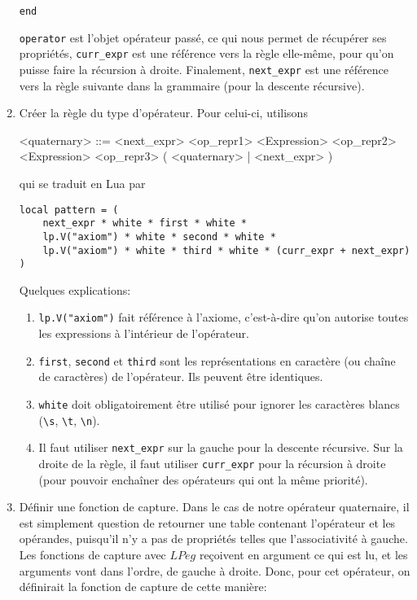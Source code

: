 \documentclass{article}
\begin{document}
\begin{enumerate}
\begin{verbatim}
end
	\end{verbatim}
	\lstinline|operator| est l'objet opérateur passé, ce qui nous permet de récupérer ses propriétés, \lstinline|curr_expr| est une référence vers la règle elle-même, pour qu'on puisse faire la récursion à droite. Finalement, \lstinline|next_expr| est une référence vers la règle suivante dans la grammaire (pour la descente récursive).
	\item Créer la règle du type d'opérateur. Pour celui-ci, utilisons
	\begin{grammar}
		<quaternary> ::= <next\_expr> <op\_repr1> <Expression> <op\_repr2> <Expression> <op\_repr3> ( <quaternary> | <next\_expr> )
	\end{grammar}
	qui se traduit en Lua par
	\begin{verbatim}
local pattern = (
	next_expr * white * first * white *
	lp.V("axiom") * white * second * white * 
	lp.V("axiom") * white * third * white * (curr_expr + next_expr) 
)
	\end{verbatim}
	Quelques explications:
	\begin{enumerate}
		\item \texttt{lp.V("axiom")} fait référence à l'axiome, c'est-à-dire qu'on autorise toutes les expressions à l'intérieur de l'opérateur.
		\item \texttt{first}, \texttt{second} et \texttt{third} sont les représentations en caractère (ou chaîne de caractères) de l'opérateur. Ils peuvent être identiques.
		\item \texttt{white} doit obligatoirement être utilisé pour ignorer les caractères blancs (\lstinline|\s|, \lstinline|\t|, \lstinline|\n|).
		\item Il faut utiliser \lstinline|next_expr| sur la gauche pour la descente récursive. Sur la droite de la règle, il faut utiliser \lstinline|curr_expr| pour la récursion à droite (pour pouvoir enchaîner des opérateurs qui ont la même priorité).
	\end{enumerate}
	\item Définir une fonction de capture. Dans le cas de notre opérateur quaternaire, il est simplement question de retourner une table contenant l'opérateur et les opérandes, puisqu'il n'y a pas de propriétés telles que l'associativité à gauche. \\
	Les fonctions de capture avec $LPeg$ reçoivent en argument ce qui est lu, et les arguments vont dans l'ordre, de gauche à droite. Donc, pour cet opérateur, on définirait la fonction de capture de cette manière:

\end{enumerate}
\end{document}
